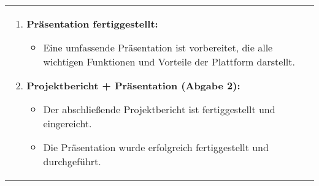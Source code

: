 \begin{tabularx}{\textwidth}{L R}
\begin{enumerate}[left=0pt,label=\arabic*.,itemsep=0.4cm]
            \item \textbf{Präsentation fertiggestellt:}
            \begin{itemize}[label=--]
                \item Eine umfassende Präsentation ist vorbereitet, die alle wichtigen Funktionen und Vorteile der Plattform darstellt.
            \end{itemize}

            \item \textbf{Projektbericht + Präsentation (Abgabe 2):}
            \begin{itemize}[label=--]
                \item Der abschließende Projektbericht ist fertiggestellt und eingereicht.
                \item Die Präsentation wurde erfolgreich fertiggestellt und durchgeführt.
            \end{itemize}
        \end{enumerate}
    \end{tabularx}

